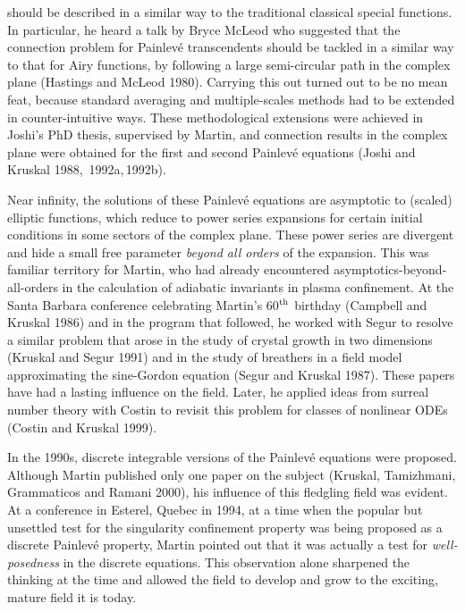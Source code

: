 \documentclass[11pt]{article}
\begin{document}
{should be described in a similar way to the traditional classical special functions. In particular, he heard a talk by 
Bryce McLeod who suggested that the connection problem for Painlev\'e transcendents should be tackled in a similar way 
to that for Airy functions, by following a large semi-circular path in the complex plane (Hastings and McLeod 1980). 
Carrying this out turned out to be no mean feat, because standard averaging and multiple-scales methods had to be extended 
in counter-intuitive ways. These methodological extensions were achieved in Joshi's PhD thesis, supervised by Martin, and connection results in the complex plane were obtained for the first and second Painlev\'e equations (Joshi and Kruskal 1988,
\,1992a,\,1992b). 
\par\smallskip%
Near infinity, the solutions of these Painlev\'e equations are asymptotic to (scaled) elliptic functions, which reduce to 
power series expansions for certain initial conditions in some sectors of the complex plane. These power series are 
divergent and hide a small free parameter \textit{beyond all orders} of the expansion. This was familiar territory for 
Martin, who had already encountered asymptotics-beyond-all-orders in the calculation of adiabatic invariants in 
plasma confinement. At the Santa Barbara conference celebrating Martin's 60$^{\rm th}$ birthday (Campbell and 
Kruskal 1986) and in the program that followed, he worked with Segur to resolve a similar problem that arose in the 
study of crystal growth in two dimensions (Kruskal and Segur 1991) and in the study of breathers in a field model 
approximating the sine-Gordon equation (Segur and Kruskal 1987). These papers have had a lasting influence on 
the field. Later, he applied ideas from surreal number theory with Costin to revisit this problem for classes of 
nonlinear ODEs (Costin and Kruskal 1999).
\par\smallskip%
In the 1990s, discrete integrable versions of the Painlev\'e equations were proposed. Although Martin published 
only one paper on the subject (Kruskal, Tamizhmani, Grammaticos and Ramani 2000), his influence of this fledgling 
field was evident. At a conference in Esterel, Quebec in 1994, at a time when the popular but unsettled test for the 
singularity confinement property was being proposed as a discrete Painlev\'e property, Martin pointed out that it 
was actually a test for \textit{well-posedness} in the discrete equations. This observation alone sharpened the thinking 
at the time and allowed the field to develop and grow to the exciting, mature field it is today.

}
\end{document}

